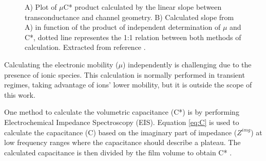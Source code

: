  \begin{figure}[h]
 	\centering
 	\hspace{2em}
 	\caption[OECTs benchmark with different OMIECs]{A) Plot of $\mu$C* product calculated by the linear slope between transconductance and channel geometry. B) Calculated slope from A) in function of the product of independent determination of $\mu$ and C*, dotted line representes the 1:1 relation between both methods of calculation. Extracted from reference %
 		\cite{inalBenchmarkingOrganicMixed2017}.}
 	\label{fig:gmuc}
 \end{figure}

Calculating the electronic mobility ($\mu$) independently is challenging due to the presence of ionic species. This calculation is normally performed in transient regimes, taking advantage of ions' lower mobility, but it is outside the scope of this work. 

One method to calculate the volumetric capacitance (C*) is by performing Electrochemical Impedance Spectroscopy (EIS). Equation \ref{eq:C} is used to calculate the capacitance (C) based on the imaginary part of impedance ($Z^{img}$) at low frequency ranges where the capacitance should describe a plateau. %
The calculated capacitance is then divided by the film volume to obtain C* %
 \cite{ohayonGuideCharacterizationOrganic2023}.

